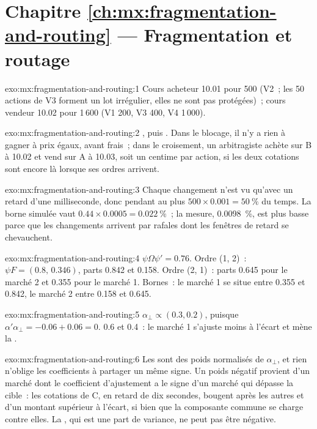 \section*{Chapitre \ref{ch:mx:fragmentation-and-routing} --- Fragmentation et routage}

\begin{solution}{exo:mx:fragmentation-and-routing:1}
Cours acheteur 10.01 pour 500 (V2~; les 50 actions de V3 forment un lot irrégulier, elles ne sont pas protégées)~; cours vendeur 10.02 pour 1\,600 (V1 200, V3 400, V4 1\,000).
\end{solution}

\begin{solution}{exo:mx:fragmentation-and-routing:2}
, puis . Dans le blocage, il n'y a rien à gagner à prix égaux, avant frais~; dans le croisement, un arbitragiste achète sur B à 10.02 et vend sur A à
10.03, soit un centime par action, si les deux cotations sont encore là lorsque ses ordres arrivent.
\end{solution}

\begin{solution}{exo:mx:fragmentation-and-routing:3}
Chaque changement n'est vu qu'avec un retard d'une milliseconde, donc pendant au plus $500\times0.001=50~\%$ du temps. La borne simulée vaut $0.44\times0.0005=0.022~\%$~; la mesure,
0.0098~\%, est plus basse parce que les changements arrivent par rafales dont les fenêtres de retard se chevauchent.
\end{solution}

\begin{solution}{exo:mx:fragmentation-and-routing:4}
$\psi\Omega\psi'=0.76$. Ordre (1, 2)~: $\psi F=(0.8,\,0.346)$, parts 0.842 et 0.158. Ordre (2, 1)~: parts 0.645 pour le marché 2 et 0.355 pour le marché 1.
Bornes~: le marché 1 se situe entre 0.355 et 0.842, le marché 2 entre 0.158 et 0.645.
\end{solution}

\begin{solution}{exo:mx:fragmentation-and-routing:5}
$\alpha_\perp\propto(0.3,0.2)$, puisque $\alpha'\alpha_\perp=-0.06+0.06=0$.  0.6 et 0.4~: le marché 1 s'ajuste moins à l'écart et mène la .
\end{solution}

\begin{solution}{exo:mx:fragmentation-and-routing:6}
Les  sont des poids normalisés de $\alpha_\perp$, et rien n'oblige les coefficients à partager un même signe. Un poids négatif provient d'un marché dont le
coefficient d'ajustement a le signe d'un marché qui dépasse la cible~: les cotations de C, en retard de dix secondes, bougent après les autres et d'un montant supérieur à l'écart, si bien que la
composante commune se charge contre elles. La , qui est une part de variance, ne peut pas être négative.
\end{solution}

